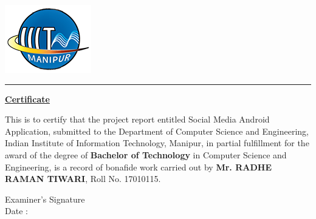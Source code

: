 

\noindent
\begin{minipage}{0.15\textwidth}
	\includegraphics[scale=0.60]{iiitm-logo.png} 
\end{minipage}%
\hfill%
\begin{minipage}{1.0\textwidth}
\begin{center}

\end{center}
\end{minipage}
\bigskip 
\noindent\rule{15cm}{0.8pt}

\begin{center}
	\textbf{\underline{ Certificate }}
\end{center}%
\begin{onehalfspace}
This is to certify that the project report entitled Social Media Android Application, submitted to the Department of Computer Science and Engineering, Indian Institute of Information Technology, Manipur, in partial fulfillment for the award of the degree of \textbf{ Bachelor of Technology} in Computer Science and Engineering, is a record of bonafide work carried out by \textbf{ Mr. RADHE RAMAN TIWARI}, Roll No. 17010115.

\end{onehalfspace}

\vspace{1.5cm}
\begin{flushleft}
Examiner's Signature\\
\bigskip \bigskip 
Date :
\end{flushleft}


